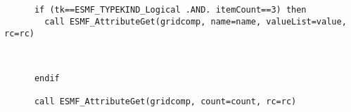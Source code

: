  \begin{verbatim}

      
      if (tk==ESMF_TYPEKIND_Logical .AND. itemCount==3) then
        call ESMF_AttributeGet(gridcomp, name=name, valueList=value, rc=rc)
 
\end{verbatim}
 

 \begin{verbatim}

      endif
      
      call ESMF_AttributeGet(gridcomp, count=count, rc=rc)
 
\end{verbatim}

\setlength{\parskip}{\oldparskip}
\setlength{\parindent}{\oldparindent}
\setlength{\baselineskip}{\oldbaselineskip}
